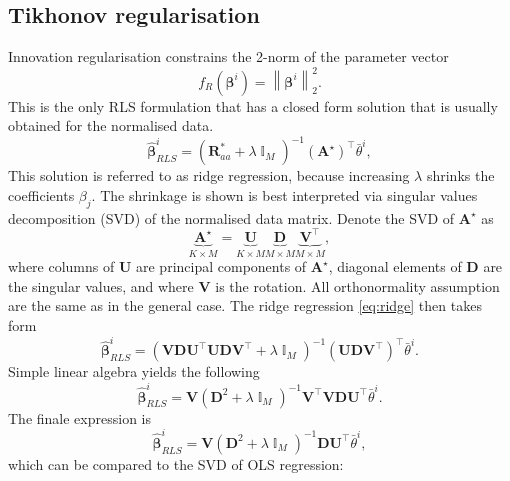 \documentclass[a4paper,11pt,twoside]{article}
\newcommand{\norm}[1]{\left\lVert#1\right\rVert}
\DeclareMathOperator{\eye}{\mathbb{I}}
\theoremstyle{mytheoremstyle}
\begin{document}
\subsection{Tikhonov regularisation}
Innovation regularisation  constrains the 2-norm of the parameter vector
\begin{equation}
f_{R}(\mathbf{\beta}^i) = \norm{\mathbf{\beta}^i}^{2}_{2}.
\end{equation}
This is the only RLS formulation that has a closed form solution that is usually obtained for the normalised data. 
\begin{equation}\label{eq:ridge}
\hat{\mathbf{\beta}}^{i}_{RLS} = (\mathbf{R}^{*}_{aa} + \lambda \eye_M)^{-1} (\mathbf{A}^{\star})^{\top}\bar{\theta}^i,  
\end{equation}
This solution is referred to as ridge regression, because increasing $\lambda$ shrinks the coefficients $\beta_j$. The shrinkage is shown is best interpreted via singular values decomposition (SVD) of the normalised data matrix. Denote the SVD of $\mathbf{A}^{\star}$ as
\begin{equation}
\underbrace{\mathbf{A}^{\star}}_{K \times M} = \underbrace{\mathbf{U}}_{K \times M}\underbrace{\mathbf{D}}_{M \times M}\underbrace{\mathbf{V}^{\top}}_{M \times M},
\end{equation}
where columns of $\mathbf{U}$ are principal components of $\mathbf{A}^{\star}$, diagonal elements of  $\mathbf{D}$ are the singular values, and where $\mathbf{V}$ is the rotation. All orthonormality assumption are the same as in the general case. The ridge regression \eqref{eq:ridge} then takes form
\begin{equation}
\hat{\mathbf{\beta}}^{i}_{RLS} = \left( \mathbf{V}\mathbf{D}\mathbf{U}^{\top}\mathbf{U}\mathbf{D}\mathbf{V}^{\top}  + \lambda \eye_M\right)^{-1} \left( \mathbf{U}\mathbf{D}\mathbf{V}^{\top}\right)^{\top}\bar{\theta}^i.
\end{equation}
Simple linear algebra yields the following
\begin{equation}
\hat{\mathbf{\beta}}^{i}_{RLS} =  \mathbf{V}\left(\mathbf{D}^2  + \lambda \eye_M\right)^{-1}\mathbf{V}^{\top} \mathbf{V}\mathbf{D}\mathbf{U}^{\top}\bar{\theta}^i.
\end{equation}
The finale expression is
\begin{equation}\label{eq:rls_svd}
\hat{\mathbf{\beta}}^{i}_{RLS} = \mathbf{V}\left(\mathbf{D}^2  + \lambda \eye_M\right)^{-1}\mathbf{D}\mathbf{U}^{\top}\bar{\theta}^i,
\end{equation}
which can be compared to the SVD of OLS regression:
\end{document}
